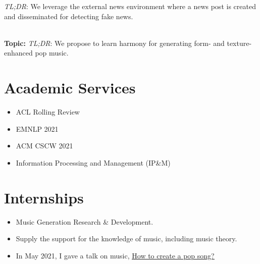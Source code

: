 \documentclass{resume}
\begin{document}
{{
{\small {}
\small
\textit{TL;DR}: We leverage the external news environment where a news post is created and disseminated for detecting fake news.

\textbf{\\ \large Topic: }
{\small {}
}
\small
\textit{TL;DR}: We propose to learn harmony for generating form- and texture- enhanced pop music.

\section{Academic Services}
\begin{itemize}
  \item ACL Rolling Review
  \item EMNLP 2021
  \item ACM CSCW 2021
  \item Information Processing and Management (IP\&M)
\end{itemize}

\section{Internships}
{\small {}
}
\begin{itemize}
  \item Music Generation Research \& Development.
  \item Supply the support for the knowledge of music, including music theory. 
  \item In May 2021, I gave a talk on music, \href{https://www.zhangxueyao.com/data/wcpr-pop-music.pdf}{\underline{How to create a pop song?}}
\end{itemize}

}}}
\end{document}
